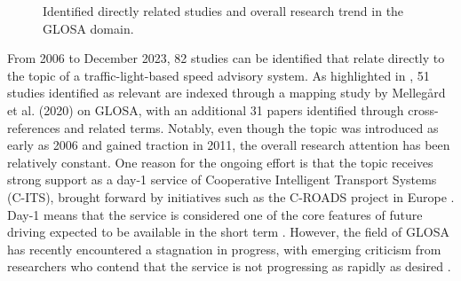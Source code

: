 \begin{figure}[t]
\centering
{}
\caption{Identified directly related studies and overall research trend in the GLOSA domain.}
\label{fig:related-work-research-method}
\end{figure}

From 2006 to December 2023, 82 studies can be identified that relate directly to the topic of a traffic-light-based speed advisory system. As highlighted in , 51 studies identified as relevant are indexed through a mapping study by Mellegård et al. (2020) \cite{mellegard_day_2020} on GLOSA, with an additional 31 papers identified through cross-references and related terms. Notably, even though the topic was introduced as early as 2006 and gained traction in 2011, the overall research attention has been relatively constant. One reason for the ongoing effort is that the topic receives strong support as a day-1 service of Cooperative Intelligent Transport Systems (C-ITS), brought forward by initiatives such as the C-ROADS project in Europe \cite{sharara_impact_2019}. Day-1 means that the service is considered one of the core features of future driving expected to be available in the short term \cite{mellegard_day_2020}. However, the field of GLOSA has recently encountered a stagnation in progress, with emerging criticism from researchers who contend that the service is not progressing as rapidly as desired \cite{mellegard_day_2020, otto_framework_2023}.

